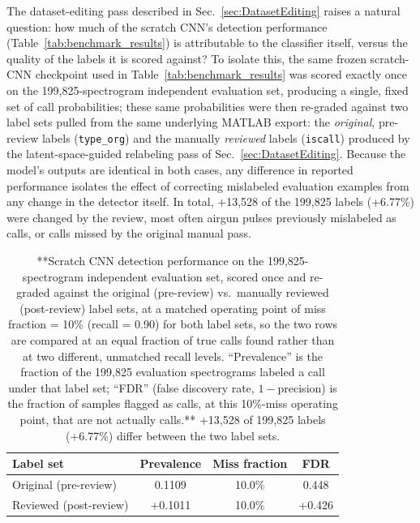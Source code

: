 \documentclass[preprint,NumberedRefs]{JASAnew}
\begin{document}
The dataset-editing pass described in Sec.~\ref{sec:DatasetEditing} raises a
natural question: how much of the scratch CNN's detection performance
(Table~\ref{tab:benchmark_results}) is attributable to the classifier itself,
versus the quality of the labels it is scored against? To isolate this, the
same frozen scratch-CNN checkpoint used in Table~\ref{tab:benchmark_results}
was scored exactly once on the 199,825-spectrogram independent evaluation
set, producing a single, fixed set of call probabilities; these same
probabilities were then re-graded against two label sets pulled from the
same underlying MATLAB export: the \emph{original}, pre-review labels
(\texttt{type\_org}) and the manually \emph{reviewed} labels (\texttt{iscall})
produced by the latent-space-guided relabeling pass of
Sec.~\ref{sec:DatasetEditing}. Because the model's outputs are identical in
both cases, any difference in reported performance isolates the effect of
correcting mislabeled evaluation examples from any change in the detector
itself. In total, {+}13,528 of the 199,825 labels ({+}6.77\%) were changed by the
review, most often airgun pulses previously mislabeled as calls, or calls
missed by the original manual pass.

\begin{table}[ht]
    \centering
    \caption{**Scratch CNN detection performance on the 199,825-spectrogram
    independent evaluation set, scored once and re-graded against the
    original (pre-review) vs.\ manually reviewed (post-review) label sets, at
    a matched operating point of miss fraction = 10\% (recall = 0.90) for both
    label sets, so the two rows are compared at an equal fraction of true
    calls found rather than at two different, unmatched recall levels.
    ``Prevalence'' is the fraction of the 199,825 evaluation spectrograms
    labeled a call under that label set; ``FDR'' (false discovery rate,
    $1-$precision) is the fraction of samples flagged as calls, at this
    10\%-miss operating point, that are not actually calls.**
    {+}13,528 of 199,825 labels ({+}6.77\%) differ between the two label sets.}
    \label{tab:cnn_relabel_results}
    \begin{tabular}{|l|c|c|c|}
        \hline
        Label set & Prevalence & Miss fraction & FDR \\
        \hline
        Original (pre-review)  & 0.1109 & 10.0\% & 0.448 \\
        Reviewed (post-review) & {+}0.1011 & 10.0\% & {+}0.426 \\
        \hline
    \end{tabular}
\end{table}
\end{document}
